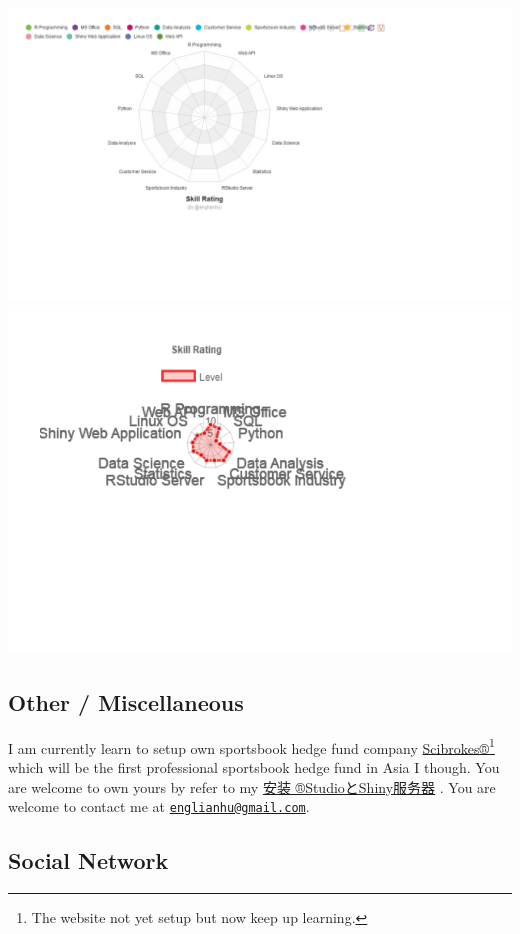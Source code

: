 \documentclass[]{article}
\let\rmarkdownfootnote\footnote%
\def\footnote{\protect\rmarkdownfootnote}
\begin{document}
\includegraphics{ryo-eng_files/figure-latex/skill2-1.pdf}
\includegraphics{ryo-eng_files/figure-latex/skill2-2.pdf}

\subsection{Other / Miscellaneous}\label{other-miscellaneous}

I am currently learn to setup own sportsbook hedge fund company
\href{https://github.com/scibrokes}{Scibrokes®}\footnote{The website not
  yet setup but now keep up learning.} which will be the first
professional sportsbook hedge fund in Asia I though. You are welcome to
own yours by refer to my
\href{https://github.com/Scibrokes/setup-rstudio-server}{安装
®StudioとShiny服务器} . You are welcome to contact me at
\href{mailto:englianhu@gmail.com}{\nolinkurl{englianhu@gmail.com}}.

\subsection{Social Network}\label{social-network}
\end{document}
